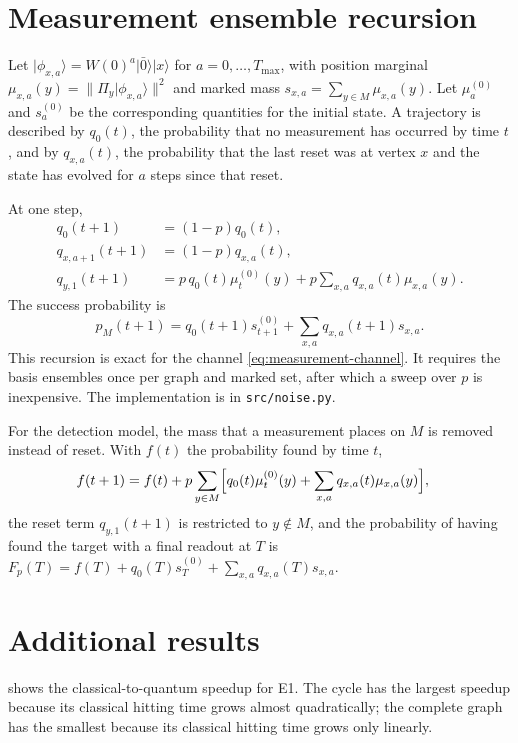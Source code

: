 \section{Measurement ensemble recursion}
\label{app:measurement}

Let $\lvert\phi_{x,a}\rangle=W(0)^a\lvert\bar0\rangle\lvert x\rangle$ for
$a=0,\dots,T_{\max}$, with position marginal
$\mu_{x,a}(y)=\lVert\Pi_y\lvert\phi_{x,a}\rangle\rVert^2$ and marked mass
$s_{x,a}=\sum_{y\in M}\mu_{x,a}(y)$. Let $\mu^{(0)}_a$ and $s^{(0)}_a$ be the
corresponding quantities for the initial state. A trajectory is described by
$q_0(t)$, the probability that no measurement has occurred by time $t$, and by
$q_{x,a}(t)$, the probability that the last reset was at vertex $x$ and the
state has evolved for $a$ steps since that reset.

At one step,
\begin{align}
  q_0(t+1)&=(1-p)q_0(t),\\
  q_{x,a+1}(t+1)&=(1-p)q_{x,a}(t),\\
  q_{y,1}(t+1)&=p\,q_0(t)\mu^{(0)}_t(y)
  +p\sum_{x,a}q_{x,a}(t)\mu_{x,a}(y).
\end{align}
The success probability is
\begin{equation}
  p_M(t+1)=q_0(t+1)s^{(0)}_{t+1}
  +\sum_{x,a}q_{x,a}(t+1)s_{x,a}.
\end{equation}
This recursion is exact for the channel \eqref{eq:measurement-channel}. It
requires the basis ensembles once per graph and marked set, after which a
sweep over $p$ is inexpensive. The implementation is in
\texttt{src/noise.py}.

For the detection model, the mass that a measurement places on $M$ is removed
instead of reset. With $f(t)$ the probability found by time $t$,
\begin{align}
  f(t+1)&=f(t)+p\sum_{y\in M}\Bigl[q_0(t)\mu^{(0)}_t(y)
  +\sum_{x,a}q_{x,a}(t)\mu_{x,a}(y)\Bigr],
\end{align}
the reset term $q_{y,1}(t+1)$ is restricted to $y\notin M$, and the probability
of having found the target with a final readout at $T$ is
$F_p(T)=f(T)+q_0(T)s^{(0)}_T+\sum_{x,a}q_{x,a}(T)s_{x,a}$.

\section{Additional results}
\label{app:additional}

 shows the classical-to-quantum speedup for E1. The cycle
has the largest speedup because its classical hitting time grows almost
quadratically; the complete graph has the smallest because its classical
hitting time grows only linearly.

